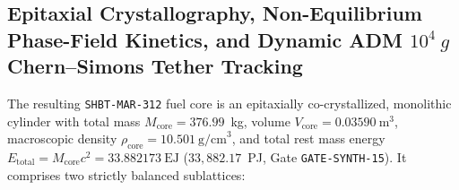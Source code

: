 \documentclass[11pt,onecolumn]{article}
\begin{document}
\subsection[Epitaxial Crystallography, Non-Equilibrium Phase-Field Kinetics, and Dynamic ADM CS Tether Tracking]{Epitaxial Crystallography, Non-Equilibrium Phase-Field Kinetics, and Dynamic ADM \texorpdfstring{$10^4~g$}{10^4 g} Chern--Simons Tether Tracking}
\label{subsec:crystallography_stasis}
The resulting \texttt{SHBT-MAR-312} fuel core is an epitaxially co-crystallized, monolithic cylinder with total mass $M_{\text{core}} = 376.99$~kg, volume $V_{\text{core}} = 0.03590~\text{m}^3$, macroscopic density $\rho_{\text{core}} = 10.501~\text{g/cm}^3$, and total rest mass energy $E_{\text{total}} = M_{\text{core}}c^2 = 33.882173~\text{EJ}$ ($33{,}882.17$~PJ, Gate \texttt{GATE-SYNTH-15}). It comprises two strictly balanced sublattices:
\end{document}
